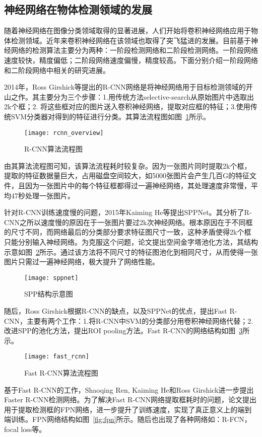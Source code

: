 \subsection{神经网络在物体检测领域的发展}
随着神经网络在图像分类领域取得的显著进展，人们开始将卷积神经网络应用于物体检测领域。近年来卷积神经网络在该领域也取得了突飞猛进的发展。目前基于神经网络的检测算法主要分为两种：一阶段检测网络和二阶段检测网络。一阶段网络速度较快，精度偏低；二阶段网络速度偏慢，精度较高。下面分别介绍一阶段网络和二阶段网络中相关的研究进展。

2014年，Ross Girshick等提出的R-CNN网络是将神经网络用于目标检测领域的开山之作。其主要分为三个步骤：1.用传统方法selective-search从原始图片中选取出2k个框；2. 将这些框对应的图片送入卷积神经网络，提取对应框的特征；3.使用传统SVM分类器对得到的特征进行分类。其算法流程图如图~\ref{fig:rcnn_overview}所示。

\begin{figure}[htp]
\centering
\texttt{[image: rcnn\_overview]}
\caption{R-CNN算法流程图}
\label{fig:rcnn_overview}
\end{figure}
由其算法流程图可知，该算法流程耗时较复杂。因为一张图片同时提取2k个框，提取的特征数据量巨大，占用磁盘空间较大，如5000张图片会产生几百G的特征文件，且因为一张图片中的每个特征框都得过一遍神经网络，其处理速度非常慢，平均47秒处理一张图片。

针对R-CNN训练速度慢的问题，2015年Kaiming He等提出SPPNet。其分析了R-CNN之所以速度慢的原因在于一张图片要过2k次神经网络。根本原因在于不同框的尺寸不同，而网络最后的分类部分要求特征图尺寸一致，这种矛盾使得2k个框只能分别输入神经网络。为克服这个问题，论文提出空间金字塔池化方法，其结构示意如图~\ref{fig:sppnet}所示。通过该方法将不同尺寸的特征图池化到相同尺寸，从而使得一张图片只需过一遍神经网络，极大提升了网络性能。

\begin{figure}[htp]
\centering
\texttt{[image: sppnet]}
\caption{SPP结构示意图}
\label{fig:sppnet}
\end{figure}
随后，Ross Girshick根据R-CNN的缺点，以及SPPNet的优点，提出Fast R-CNN，主要有两个工作：1.将R-CNN中SVM的分类部分用卷积神经网络代替；2.改进SPP的池化方法，提出ROI pooling方法。Fast R-CNN的网络结构如图~\ref{fig:fast_rcnn}所示。

\begin{figure}[htp]
\centering
\texttt{[image: fast\_rcnn]}
\caption{Fast R-CNN算法流程图}
\label{fig:fast_rcnn}
\end{figure}
基于Fast R-CNN的工作，Shaoqing Ren, Kaiming He和Ross Girshick进一步提出Faster R-CNN检测网络。为了解决Fast R-CNN网络提取框耗时的问题，论文提出用于提取检测框的FPN网络，进一步提升了训练速度，实现了真正意义上的端到端训练。FPN网络结构如图~\ref{fig:fpn}所示。随后也出现了各种网络如：R-FCN，focal loss等。

